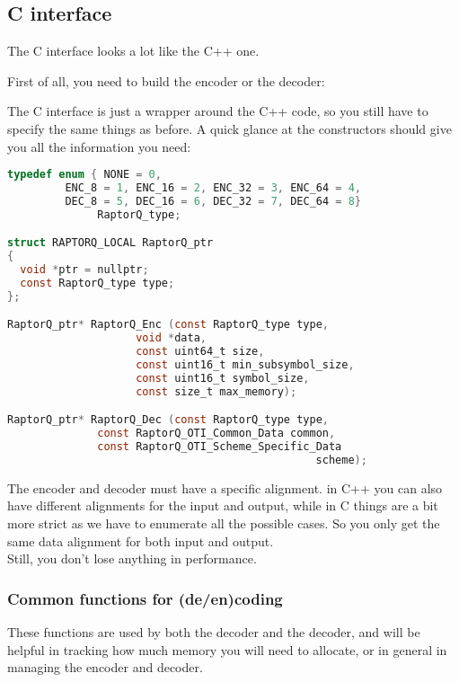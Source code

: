 \documentclass[11pt,a4paper]{refart}
\begin{document}
\newpage
\subsection{C interface}
The C interface looks a lot like the C++ one.

First of all, you need to build the encoder or the decoder:

The C interface is just a wrapper around the C++ code, so you still have to specify the same things as before.
A quick glance at the constructors should give you all the information you need:

\begin{lstlisting}[language=C]
typedef enum { NONE = 0,
         ENC_8 = 1, ENC_16 = 2, ENC_32 = 3, ENC_64 = 4,
         DEC_8 = 5, DEC_16 = 6, DEC_32 = 7, DEC_64 = 8}
              RaptorQ_type;

struct RAPTORQ_LOCAL RaptorQ_ptr
{
  void *ptr = nullptr;
  const RaptorQ_type type;
};

RaptorQ_ptr* RaptorQ_Enc (const RaptorQ_type type,
                    void *data,
                    const uint64_t size,
                    const uint16_t min_subsymbol_size,
                    const uint16_t symbol_size,
                    const size_t max_memory);

RaptorQ_ptr* RaptorQ_Dec (const RaptorQ_type type,
              const RaptorQ_OTI_Common_Data common,
              const RaptorQ_OTI_Scheme_Specific_Data
                                                scheme);
\end{lstlisting}

The encoder and decoder must have a specific alignment. in C++ you can also have different
alignments for the input and output, while in C things are a bit more strict as we have to enumerate
all the possible cases. So you only get the same data alignment for both input and output.\\
Still, you don't lose anything in performance.\\

\newpage
\subsubsection{Common functions for (de/en)coding}

These functions are used by both the decoder and the decoder, and will be helpful in tracking how much memory
you will need to allocate, or in general in managing the encoder and decoder.
\end{document}
